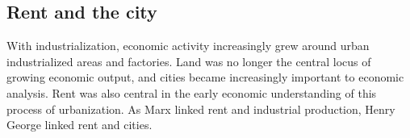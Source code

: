 

\subsection{Rent and the city} 
With industrialization, economic activity increasingly grew around urban industrialized areas and factories. Land was no longer the central locus of growing economic output, and cities became increasingly important to economic analysis. Rent was also central in the early economic understanding of this process of urbanization. 
As Marx linked rent and industrial production, Henry George linked rent and cities. 

